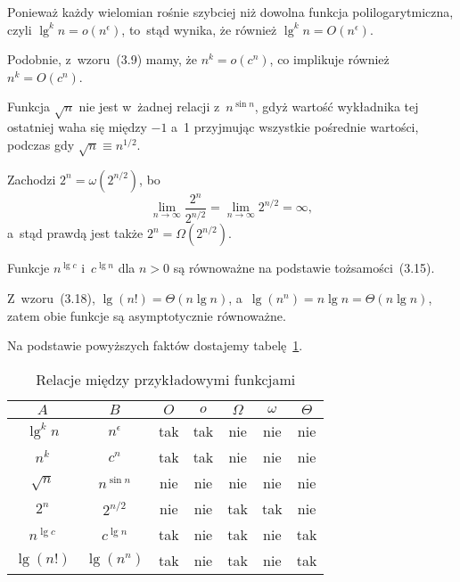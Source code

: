 \subexercise{} %
Ponieważ każdy wielomian rośnie szybciej niż dowolna funkcja polilogarytmiczna, czyli $\lg^kn=o(n^\epsilon)$, to~stąd wynika, że również $\lg^kn=O(n^\epsilon)$.

\subexercise{} %
Podobnie, z~wzoru~(3.9) mamy, że $n^k=o(c^n)$, co implikuje również $n^k=O(c^n)$.

\subexercise{} %
Funkcja $\sqrt{n}$ nie jest w~żadnej relacji z~$n^{\sin n}$, gdyż wartość wykładnika tej ostatniej waha się między $-1$ a~1 przyjmując wszystkie pośrednie wartości, podczas gdy $\sqrt{n}\equiv n^{1/2}$.

\subexercise{} %
Zachodzi $2^n=\omega(2^{n/2})$, bo
\[
	\lim_{n\to\infty}\frac{2^n}{2^{n/2}} = \lim_{n\to\infty}2^{n/2} = \infty,
\]
a~stąd prawdą jest także $2^n=\Omega(2^{n/2})$.

\subexercise{} %
Funkcje $n^{\lg c}$ i~$c^{\lg n}$ dla $n>0$ są równoważne na podstawie tożsamości~(3.15).

\subexercise{} %
Z~wzoru~(3.18), $\lg(n!)=\Theta(n\lg n)$, a~$\lg(n^n)=n\lg n=\Theta(n\lg n)$, zatem obie funkcje są asymptotycznie równoważne.

\bigskip
\noindent Na podstawie powyższych faktów dostajemy tabelę~\ref{tab:3-2}.
\begin{table}[ht]
	\begin{center}
		\begin{tabular}{cc|c|c|c|c|c|}
			$A$ & $B$ & $O$ & $o$ & $\Omega$ & $\omega$ & $\Theta$ \\
			\hline
			$\lg^kn$ & $n^\epsilon$ & tak & tak & nie & nie & nie \\
			\hline
			$n^k$ & $c^n$ & tak & tak & nie & nie & nie \\
			\hline
			$\sqrt{n}$ & $n^{\sin n}$ & nie & nie & nie & nie & nie \\
			\hline
			$2^n$ & $2^{n/2}$ & nie & nie & tak & tak & nie \\
			\hline
			$n^{\lg c}$ & $c^{\lg n}$ & tak & nie & tak & nie & tak \\
			\hline
			$\lg(n!)$ & $\lg(n^n)$ & tak & nie & tak & nie & tak \\
			\hline
		\end{tabular}
		\caption{Relacje między przykładowymi funkcjami} \label{tab:3-2}
	\end{center}
\end{table}


